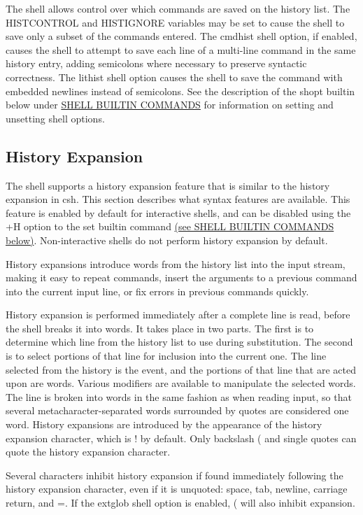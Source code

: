The shell allows control over which commands are saved on the history list. The HISTCONTROL and HISTIGNORE variables may be set to cause the shell to save only a subset of the commands entered. The cmdhist shell option, if enabled, causes the shell to attempt to save each line of a multi-line command in the same history entry, adding semicolons where necessary to preserve syntactic correctness. The lithist shell option causes the shell to save the command with embedded newlines instead of semicolons. See the description of the shopt builtin below under \hyperref[sec:shellbuiltincommands]{SHELL BUILTIN COMMANDS} for information on setting and unsetting shell options.

\subsection{History Expansion}\label{sec:historyexpansion}
The shell supports a history expansion feature that is similar to the history expansion in csh. This section describes what syntax features are available. This feature is enabled by default for interactive shells, and can be disabled using the +H option to the set builtin command \hyperref[sec:shellbuiltincommands]{(see SHELL BUILTIN COMMANDS below)}. Non-interactive shells do not perform history expansion by default.

History expansions introduce words from the history list into the input stream, making it easy to repeat commands, insert the arguments to a previous command into the current input line, or fix errors in previous commands quickly.

History expansion is performed immediately after a complete line is read, before the shell breaks it into words. It takes place in two parts. The first is to determine which line from the history list to use during substitution. The second is to select portions of that line for inclusion into the current one. The line selected from the history is the event, and the portions of that line that are acted upon are words. Various modifiers are available to manipulate the selected words. The line is broken into words in the same fashion as when reading input, so that several metacharacter-separated words surrounded by quotes are considered one word. History expansions are introduced by the appearance of the history expansion character, which is ! by default. Only backslash (\) and single quotes can quote the history expansion character.

Several characters inhibit history expansion if found immediately following the history expansion character, even if it is unquoted: space, tab, newline, carriage return, and =. If the extglob shell option is enabled, ( will also inhibit expansion.

